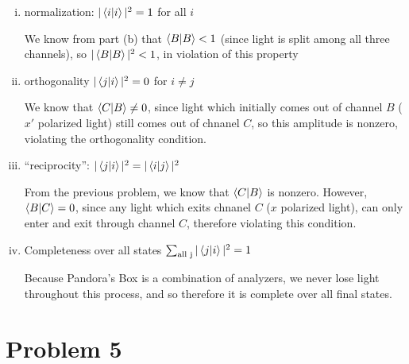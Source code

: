 \documentclass[10pt]{article}
\begin{document}
\begin{enumerate}[(a)]
        \begin{enumerate}[(i)]
            \item normalization: $|\braket{i}{i}|^2 = 1$ for all $i$
            
            \begin{solution}
                We know from part (b) that $\braket{B}{B} < 1$ (since light is split among all three channels), so $|\braket{B}{B}|^2 < 1$, in violation of this property
            \end{solution}

            \item orthogonality $|\braket{j}{i}|^2 = 0$ for $i \neq j$

            \begin{solution}
                We know that $\braket{C}{B} \neq 0$, since light which initially comes out of channel $B$ ($x'$ polarized light) still comes out of chnanel $C$, so this amplitude is nonzero, violating the orthogonality condition.                
            \end{solution}

            \item ``reciprocity'': $|\braket{j}{i}|^2 = |\braket{i}{j}|^2$
            
            \begin{solution}
                From the previous problem, we know that $\braket{C}{B}$ is nonzero. However, $\braket{B}{C} = 0$, since any light which exits chnanel $C$ ($x$ polarized light), can only enter and exit through channel $C$, therefore violating this condition.
            \end{solution}

            \item Completeness over all states $\sum_{\text{all j}} |\braket{j}{i}|^2 = 1$
            
            \begin{solution}
                Because Pandora's Box is a combination of analyzers, we never lose light throughout this process, and so therefore it is complete over all final states.
            \end{solution}
        \end{enumerate}
    \end{enumerate}


    \pagebreak

    \section*{Problem 5}
\end{document}
